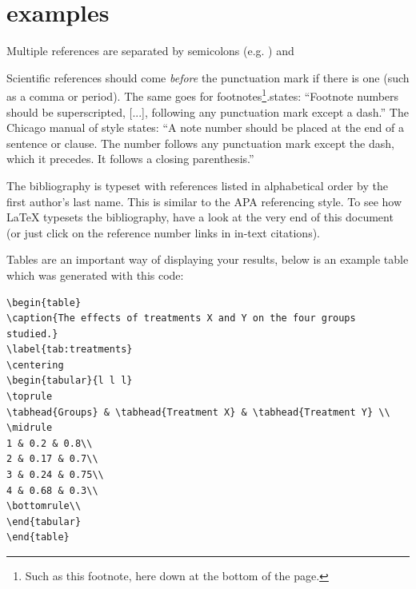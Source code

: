 

\section{examples}
\cite{Blei:2006:DTM:1143844.1143859}
\citep{Chang:Boyd-Graber:Wang:Gerrish:Blei-2009}
\citep{DBLP:journals/corr/RosnerHRNB14}
\citep{DBLP:journals/corr/abs-1206-3298}
\citep{Hall:2008:SHI:1613715.1613763}
\citep{Wang:2006:TOT:1150402.1150450}
\cite{conf/icdm/AlSumaitBD08}
\citep{icml2010_GerrishB10}

Multiple references are separated by semicolons (e.g. \parencite{Blei:2006:DTM:1143844.1143859, Wang:2006:TOT:1150402.1150450}) and 

Scientific references should come \emph{before} the punctuation mark if there is one (such as a comma or period). The same goes for footnotes\footnote{Such as this footnote, here down at the bottom of the page.}.states: \enquote{Footnote numbers should be superscripted, [...], following any punctuation mark except a dash.} The Chicago manual of style states: \enquote{A note number should be placed at the end of a sentence or clause. The number follows any punctuation mark except the dash, which it precedes. It follows a closing parenthesis.}

The bibliography is typeset with references listed in alphabetical order by the first author's last name. This is similar to the APA referencing style. To see how \LaTeX{} typesets the bibliography, have a look at the very end of this document (or just click on the reference number links in in-text citations).


Tables are an important way of displaying your results, below is an example table which was generated with this code:

{\small
\begin{verbatim}
\begin{table}
\caption{The effects of treatments X and Y on the four groups studied.}
\label{tab:treatments}
\centering
\begin{tabular}{l l l}
\toprule
\tabhead{Groups} & \tabhead{Treatment X} & \tabhead{Treatment Y} \\
\midrule
1 & 0.2 & 0.8\\
2 & 0.17 & 0.7\\
3 & 0.24 & 0.75\\
4 & 0.68 & 0.3\\
\bottomrule\\
\end{tabular}
\end{table}
\end{verbatim}
}

